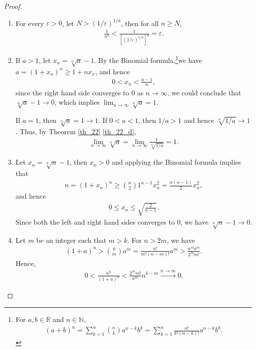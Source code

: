 \documentclass[10pt]{book}
\theoremstyle{definition}
\numberwithin{equation}{chapter}
\begin{document}
\begin{proof}
~\begin{enumerate}[label=(\alph*)]
    \item For every $\varepsilon > 0$, let $N > (1/\varepsilon)^{1/a}$, then for all $n \geq N$, 
    \begin{align*}
        \frac{1}{n^a} < \frac{1}{\left[(1/\varepsilon)^{1/a}\right]^a} = \varepsilon.
    \end{align*}
    
    \item If $a > 1$, let $x_n = \sqrt[n]{a} - 1$. By the Binomial formula,\footnote{For $a, b \in \mathbb{R}$ and $n \in \mathbb{N}$, \begin{align*}
    (a + b)^n = \sum^n_{k=1} \binom{n}{k} a^{n-k}b^{k} = \sum^n_{k=1} \frac{n!}{k!(n-k)!} a^{n-k}b^{k}.
    \end{align*}}we have $a = (1 + x_n)^n \geq 1 + nx_x$, and hence
    \begin{align*}
        0 < x_n < \frac{a - 1}{n},
    \end{align*}
    since the right hand side converges to $0$ as $n \to \infty$, we could conclude that $\sqrt[n]{a} - 1 \to 0$, which implies $\lim_{n\to\infty} \sqrt[n]{a} = 1$.

    If $a = 1$, then $\sqrt[n]{a} = 1 \to 1$. If $0 < a < 1$, then $1/a > 1$ and hence $\sqrt[n]{1/a} \to 1$. Thus, by Theorem \ref{th_22} \ref{th_22_d},
    \begin{align*}
        \lim_{n\to\infty} \sqrt[n]{a} = \lim_{n\to\infty} \frac{1}{\sqrt[n]{1/a}} = 1.
    \end{align*}
    
    \item Let $x_n = \sqrt[n]{n} - 1$, then $x_n > 0$ and applying the Binomial formula implies that 
    \begin{align*}
        n = (1 + x_n)^n \geq \binom{n}{2} 1^{n-1} x_n^2 = \frac{n(n-1)}{2} x_n^2,
    \end{align*}
    and hence
    \begin{align*}
        0 \leq x_n \leq \sqrt{\frac{2}{n-1}}.
    \end{align*}
    Since both the left and right hand sides converges to $0$, we have $\sqrt[n]{n} - 1 \to 0$.
    
    \item Let $m$ be an integer such that $m > k$. For $n > 2m$, we have
    \begin{align*}
        (1 + a)^n > \binom{n}{m}a^m = \frac{n!}{m!(n-m)!} a^m > \frac{n^m a^m}{2^m m!}.
    \end{align*}
    Hence, 
    \begin{align*}
        0 < \frac{n^k}{(1 + a)^n} < \frac{2^m m!}{a^m} n^{k - m} \xrightarrow[]{n\to\infty} 0.
    \end{align*}
    

\end{enumerate}
\end{proof}
\end{document}
